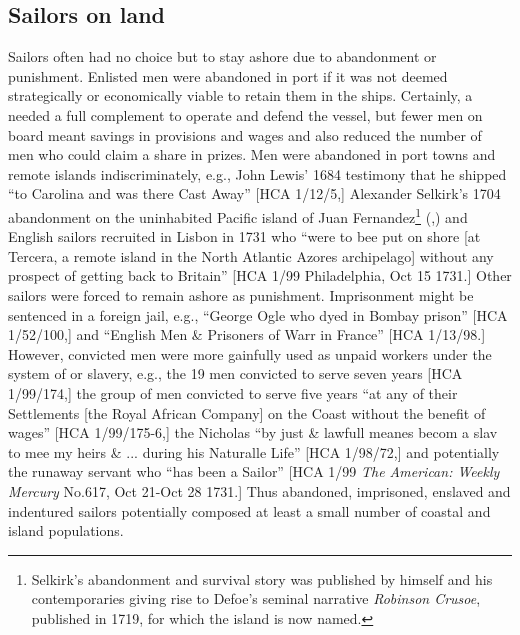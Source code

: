 \subsection{{Sailors on land}}%

Sailors often had no choice but to stay ashore due to abandonment or punishment. Enlisted men were abandoned in port if it was not deemed strategically or economically viable to retain them in the ships. Certainly, a  needed a full complement to operate and defend the vessel, but fewer men on board meant savings in provisions and wages and also reduced the number of men who could claim a share in prizes. Men were abandoned in port towns and remote islands indiscriminately, e.g., John Lewis’ 1684 testimony that he shipped “to Carolina and was there Cast Away” [HCA 1/12/5,] Alexander Selkirk’s 1704 abandonment on the uninhabited Pacific island of Juan Fernandez\footnote{Selkirk’s abandonment and survival story was published by himself and his contemporaries giving rise to Defoe’s seminal narrative \textit{Robinson Crusoe}, published in 1719, for which the island is now named.}  (\citealt{Souhami2013},) and English sailors recruited in Lisbon in 1731 who “were to bee put on shore [at Tercera, a remote island in the North Atlantic Azores archipelago] without any prospect of getting back to Britain” [HCA 1/99 Philadelphia, Oct 15 1731.] Other sailors were forced to remain ashore as punishment. Imprisonment might be sentenced in a foreign jail, e.g., “George Ogle who dyed in Bombay prison” [HCA 1/52/100,] and “English Men \& Prisoners of Warr in France” [HCA 1/13/98.] However, convicted men were more gainfully used as unpaid workers under the system of  or slavery, e.g., the 19 men convicted to serve seven years [HCA 1/99/174,] the group of men convicted to serve five years “at any of their Settlements [the Royal African Company] on the Coast without the benefit of wages” [HCA 1/99/175-6,] the  Nicholas “by just \& lawfull meanes becom a slav to mee my heirs \& ... during his Naturalle Life” [HCA 1/98/72,] and potentially the runaway servant who “has been a Sailor” [HCA 1/99 \textit{The American: Weekly Mercury} No.617, Oct 21-Oct 28 1731.] Thus abandoned, imprisoned, enslaved and indentured sailors potentially composed at least a small number of coastal and island populations. 

